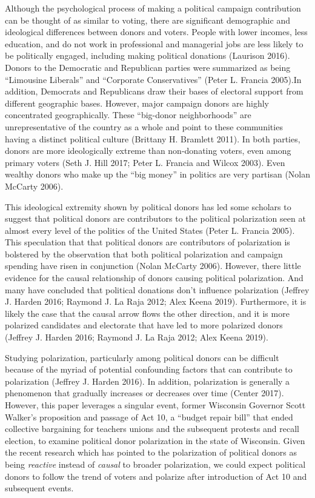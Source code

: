 \documentclass[11pt,]{article}
\begin{document}
Although the psychological process of making a political campaign
contribution can be thought of as similar to voting, there are
significant demographic and ideological differences between donors and
voters. People with lower incomes, less education, and do not work in
professional and managerial jobs are less likely to be politically
engaged, including making political donations (Laurison 2016). Donors to
the Democratic and Republican parties were summarized as being
``Limousine Liberals'' and ``Corporate Conservatives'' (Peter L. Francia
2005).In addition, Democrats and Republicans draw their bases of
electoral support from different geographic bases. However, major
campaign donors are highly concentrated geographically. These
``big-donor neighborhoods'' are unrepresentative of the country as a
whole and point to these communities having a distinct political culture
(Brittany H. Bramlett 2011). In both parties, donors are more
ideologically extreme than non-donating voters, even among primary
voters (Seth J. Hill 2017; Peter L. Francia and Wilcox 2003). Even
wealthy donors who make up the ``big money'' in politics are very
partisan (Nolan McCarty 2006).

This ideological extremity shown by political donors has led some
scholars to suggest that political donors are contributors to the
political polarization seen at almost every level of the politics of the
United States (Peter L. Francia 2005). This speculation that that
political donors are contributors of polarization is bolstered by the
observation that both political polarization and campaign spending have
risen in conjunction (Nolan McCarty 2006). However, there little
evidence for the causal relationship of donors causing political
polarization. And many have concluded that political donations don't
influence polarization (Jeffrey J. Harden 2016; Raymond J. La Raja 2012;
Alex Keena 2019). Furthermore, it is likely the case that the causal
arrow flows the other direction, and it is more polarized candidates and
electorate that have led to more polarized donors (Jeffrey J. Harden
2016; Raymond J. La Raja 2012; Alex Keena 2019).

Studying polarization, particularly among political donors can be
difficult because of the myriad of potential confounding factors that
can contribute to polarization (Jeffrey J. Harden 2016). In addition,
polarization is generally a phenomenon that gradually increases or
decreases over time (Center 2017). However, this paper leverages a
singular event, former Wisconsin Governor Scott Walker's proposition and
passage of Act 10, a ``budget repair bill'' that ended collective
bargaining for teachers unions and the subsequent protests and recall
election, to examine political donor polarization in the state of
Wisconsin. Given the recent research which has pointed to the
polarization of political donors as being \emph{reactive} instead of
\emph{causal} to broader polarization, we could expect political donors
to follow the trend of voters and polarize after introduction of Act 10
and subsequent events.
\end{document}
